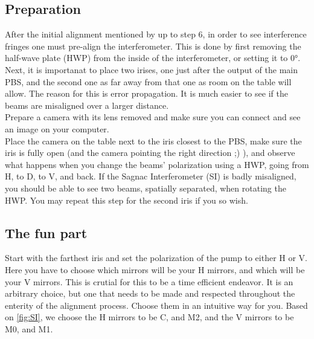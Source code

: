 \subsection{Preparation}
After the initial alignment mentioned by \cite{deny_hamel} up to step 6, in order to see interference fringes one must pre-align the interferometer. This is done by first removing the half-wave plate (HWP)
from the inside of the interferometer, or setting it to 0°.\\
Next, it is importanat to place two irises, one just after the output of the main PBS, and the second one as far away from that one as room on the table will allow.
The reason for this is error propagation. It is much easier to see if the beams are misaligned over a larger distance.\\
Prepare a camera with its lens removed and make sure you can connect and see an image on your computer.\\
Place the camera on the table next to the iris closest to the PBS, make sure the iris is fully open (and the camera pointing the right direction ;) ),
and observe what happens when you change the beams' polarization using a HWP, going from H, to D, to V, and back. If the Sagnac Interferometer (SI) is badly misaligned,
you should be able to see two beams, spatially separated, when rotating the HWP. You may repeat this step for the second iris if you so wish.\\
\subsection{The fun part}
Start with the farthest iris and set the polarization of the pump to either H or V. Here you have to choose which mirrors will be your H mirrors, and which will be your V mirrors.
This is crutial for this to be a time efficient endeavor. It is an arbitrary choice, but one that needs to be made and respected throughout the enterity of the alignment process.
Choose them in an intuitive way for you. Based on \ref{fig:SI}, we choose the H mirrors to be C, and M2, and the V mirrors to be M0, and M1.

